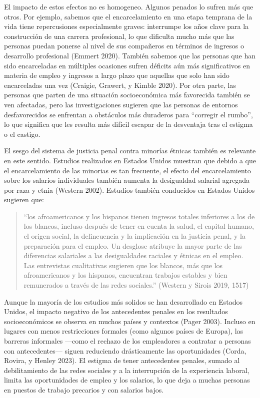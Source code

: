 \documentclass[
  spanish,
  letterpaper,
  DIV=11,
  numbers=noendperiod]{scrreprt}
\begin{document}
El impacto de estos efectos no es homogeneo. Algunos penados lo sufren
más que otros. Por ejemplo, sabemos que el encarcelamiento en una etapa
temprana de la vida tiene repercusiones especialmente graves: interrumpe
los años clave para la construcción de una carrera profesional, lo que
dificulta mucho más que las personas puedan ponerse al nivel de sus
compañeros en términos de ingresos o desarrollo profesional (Emmert
2020). También sabemos que las personas que han sido encarceladas en
múltiples ocasiones sufren déficits aún más significativos en materia de
empleo y ingresos a largo plazo que aquellas que solo han sido
encarceladas una vez (Craigie, Grawert, y Kimble 2020). Por otra parte,
las personas que parten de una situación socioeconómica más favorecida
también se ven afectadas, pero las investigaciones sugieren que las
personas de entornos desfavorecidos se enfrentan a obstáculos más
duraderos para ``corregir el rumbo'', lo que significa que les resulta
más difícil escapar de la desventaja tras el estigma o el castigo.

El sesgo del sistema de justicia penal contra minorías étnicas también
es relevante en este sentido. Estudios realizados en Estados Unidos
muestran que debido a que el encarcelamiento de las minorias es tan
frecuente, el efecto del encarcelamiento sobre los salarios individuales
también aumenta la desigualdad salarial agregada por raza y etnia
(Western 2002). Estudios también conducidos en Estados Unidos sugieren
que:

\begin{quote}
``los afroamericanos y los hispanos tienen ingresos totales inferiores a
los de los blancos, incluso después de tener en cuenta la salud, el
capital humano, el origen social, la delincuencia y la implicación en la
justicia penal, y la preparación para el empleo. Un desglose atribuye la
mayor parte de las diferencias salariales a las desigualdades raciales y
étnicas en el empleo. Las entrevistas cualitativas sugieren que los
blancos, más que los afroamericanos y los hispanos, encuentran trabajos
estables y bien remunerados a través de las redes sociales.'' (Western y
Sirois 2019, 1517)
\end{quote}

Aunque la mayoría de los estudios más solidos se han desarrollado en
Estados Unidos, el impacto negativo de los antecedentes penales en los
resultados socioeconómicos se observa en muchos países y contextos
(Pager 2003). Incluso en lugares con menos restricciones formales (como
algunos países de Europa), las barreras informales ---como el rechazo de
los empleadores a contratar a personas con antecedentes--- siguen
reduciendo drásticamente las oportunidades (Corda, Rovira, y Henley
2023). El estigma de tener antecedentes penales, sumado al
debilitamiento de las redes sociales y a la interrupción de la
experiencia laboral, limita las oportunidades de empleo y los salarios,
lo que deja a muchas personas en puestos de trabajo precarios y con
salarios bajos.
\end{document}
